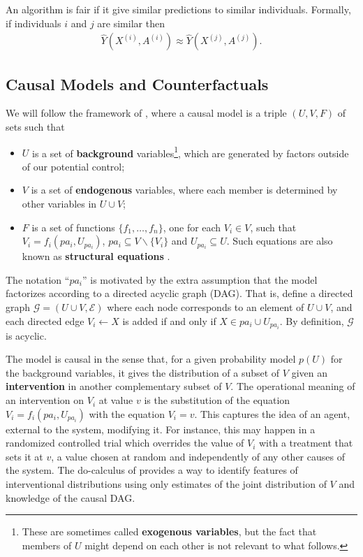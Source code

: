 \begin{define}
  An algorithm is fair if it give similar predictions to similar individuals. Formally, if individuals $i$ and $j$ are similar then
\begin{align}
  \hat{Y}(X^{(i)}, A^{(i)}) \approx \hat{Y}(X^{(j)}, A^{(j)}).\nonumber
\end{align}
\end{define}


\subsection{Causal Models and Counterfactuals}
\label{subsec:cmc}
We will follow the framework of \citet{pearl:00}, where a causal
model is a triple $(U, V, F)$ of sets such that
\begin{itemize}
\item $U$ is a set of {\bf background} variables\footnote{These are
  sometimes called {\bf exogenous variables}, but the fact that members of $U$
  might depend on each other is not relevant to what follows.}, which are generated by factors
outside of our potential control;
\item $V$ is a set of {\bf endogenous} variables, where each member is determined by
  other variables in $U \cup V$;
\item $F$ is a set of functions $\{f_1, \dots, f_n\}$, one for each $V_i \in V$, such
that $V_i = f_i(pa_i, U_{pa_i})$, $pa_i \subseteq V \backslash
\{V_i\}$ and $U_{pa_i} \subseteq U$. Such equations are also known as
{\bf structural equations} \citep{bol:89}.
\end{itemize}

The notation ``$pa_i$'' is motivated by the extra assumption that the
model factorizes according to a directed acyclic graph (DAG). That is,
define a directed graph ${\mathcal G}=(U \cup V, \mathcal E )$ where each node corresponds to an
element of $U \cup V$, and each directed edge $V_i \leftarrow X$ is added if
and only if $X \in pa_i \cup U_{pa_i}$. By definition, $\mathcal G$ is
acyclic.

The model is causal in the sense that, for a given probability model
$p(U)$ for the background variables, it gives the distribution of a
subset of $V$ given an {\bf intervention} in another complementary
subset of $V$.  The operational meaning of an intervention on $V_i$ at
value $v$ is the substitution of the equation
$V_i = f_i(pa_i, U_{pa_i})$ with the equation $V_i = v$. This captures
the idea of an agent, external to the system, modifying it. For
instance, this may happen in a randomized controlled trial which
overrides the value of $V_i$ with a treatment that sets it at $v$, a
value chosen at random and independently of any other causes of the
system. The do-calculus of \citet{pearl:00} provides a way to identify
features of interventional distributions %
using only estimates of the joint distribution of $V$ and knowledge of
the causal DAG.


